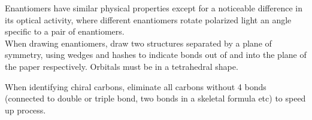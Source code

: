 \documentclass[../main]{subfiles}
\begin{document}

	Enantiomers have similar physical properties except for a noticeable difference in its optical activity, where different enantiomers rotate polarized light an angle specific to a pair of enantiomers. \\

	When drawing enantiomers, draw two structures separated by a plane of symmetry, using wedges and hashes to indicate bonds out of and into the plane of the paper respectively. Orbitals must be in a tetrahedral shape.


	When identifying chiral carbons, eliminate all carbons without 4 bonds (connected to double or triple bond, two bonds in a skeletal formula etc) to speed up process.

\end{document}

